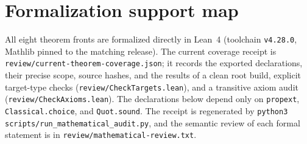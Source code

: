 \section{Formalization support map}
All eight theorem fronts are formalized directly in Lean~4 (toolchain \texttt{v4.28.0}, Mathlib pinned to the matching release).
The current coverage receipt is \texttt{review/current-theorem-coverage.json}; it records the exported declarations, their precise scope, source hashes, and the results of a clean root build, explicit target-type checks (\texttt{review/CheckTargets.lean}), and a transitive axiom audit (\texttt{review/CheckAxioms.lean}).
The declarations below depend only on \texttt{propext}, \texttt{Classical.choice}, and \texttt{Quot.sound}.
The receipt is regenerated by \texttt{python3 scripts/run\_mathematical\_audit.py}, and the semantic review of each formal statement is in \texttt{review/mathematical-review.txt}.

